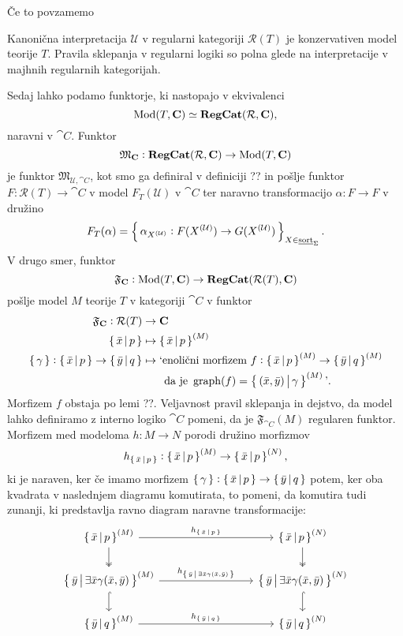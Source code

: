 \documentclass[../kategoricna_logika.tex]{subfiles}
\begin{document}
Če to povzamemo 
\begin{izrek}
  Kanonična interpretacija $\mathcal{U}$ v regularni kategoriji $\mathcal{R}(T)$ je konzervativen model teorije $T$. Pravila sklepanja v regularni logiki so polna glede na interpretacije v majhnih regularnih kategorijah.
\end{izrek}
Sedaj lahko podamo funktorje, ki nastopajo v ekvivalenci 
$$\operatorname{Mod}(T, {\operatorname{\mathbf{C}}}) \simeq {\operatorname{\mathbf{RegCat}}}(\mathcal{R}, {\operatorname{\mathbf{C}}}),$$
naravni v $\cat{C}$. Funktor 
$$\mathfrak{M}_{{\operatorname{\mathbf{C}}}} : {\operatorname{\mathbf{RegCat}}}(\mathcal{R}, {\operatorname{\mathbf{C}}}) \to \operatorname{Mod}(T, {\operatorname{\mathbf{C}}})$$
je funktor $\mathfrak{M}_{\mathcal{U}, \cat{C}}$, kot smo ga definiral v definiciji ?? in pošlje funktor $F : \mathcal{R}(T) \to \cat{C}$ v model $F_T(\mathcal{U})$ v $\cat{C}$ ter naravno transformacijo $\alpha : F \to F$ v družino
$$F_T(\alpha) = \left\lbrace\,\alpha_{{X}^{(\mathcal{U})}} : F({X}^{(\mathcal{U})}) \to G({X}^{(\mathcal{U})})\,\right\rbrace_{X \in \underline{\mathrm{sort}}_{\Sigma}}.$$
V drugo smer, funktor 
$$\mathfrak{F}_{{\operatorname{\mathbf{C}}}} : \operatorname{Mod}(T, {\operatorname{\mathbf{C}}}) \to {\operatorname{\mathbf{RegCat}}}(\mathcal{R}(T), {\operatorname{\mathbf{C}}})$$
pošlje model $M$ teorije $T$ v kategoriji $\cat{C}$ v funktor
\begin{align*}
  \mathfrak{F}_{{\operatorname{\mathbf{C}}}} : \mathcal{R}(T) &\to {\operatorname{\mathbf{C}}}\\
  \left\lbrace\,\bar{x}\,\middle|\, p\,\right\rbrace &\mapsto \left\lbrace\,\bar{x}\,\middle|\, p\,\right\rbrace^{(M)} \\
  \left\lbrace\,\gamma\,\right\rbrace : \left\lbrace\,\bar{x}\,\middle|\, p\,\right\rbrace \to \left\lbrace\,\bar{y}\,\middle|\, q\,\right\rbrace &\mapsto \text{`enolični morfizem} \ f : \left\lbrace\,\bar{x}\,\middle|\, p\,\right\rbrace^{(M)} \to \left\lbrace\,\bar{y}\,\middle|\, q\,\right\rbrace^{(M)} \\ 
  &\qquad \text{da je} \ \operatorname{graph}(f) = \left\lbrace\,(\bar{x}, \bar{y}) \,\middle|\, \gamma\,\right\rbrace^{(M)} \text{'}.
\end{align*}
Morfizem $f$ obstaja po lemi ??. Veljavnost pravil sklepanja in dejstvo, da model lahko definiramo z interno logiko $\cat{C}$ pomeni, da je $\mathfrak{F}_{\cat{C}}(M)$ regularen funktor.
Morfizem med modeloma $h : M \to N$ porodi družino morfizmov 
$$h_{\left\lbrace\,\bar{x}\,\middle|\, p\,\right\rbrace} : \left\lbrace\,\bar{x}\,\middle|\, p\,\right\rbrace^{(M)} \to \left\lbrace\,\bar{x}\,\middle|\, p\,\right\rbrace^{(N)},$$
ki je naraven, ker če imamo morfizem $\left\lbrace\,\gamma\,\right\rbrace : \left\lbrace\,\bar{x}\,\middle|\, p\,\right\rbrace \to \left\lbrace\,\bar{y}\,\middle|\, q\,\right\rbrace$ potem, ker oba kvadrata v naslednjem diagramu komutirata, to pomeni, da komutira tudi zunanji, ki predstavlja ravno diagram naravne transformacije:
\begin{equation*}
  \begin{tikzcd}[column sep=3cm]
    \set{\bar{x}\,\middle|\, p}^{(M)} \ar[d, two heads] \ar[r, "h_{\set{\bar{x}\,\middle|\, p}}"] & \set{\bar{x}\,\middle|\, p}^{(N)} \ar[d, two heads] \\
    \set{\bar{y}\,\middle|\, \exists \bar{x} \gamma(\bar{x}, \bar{y})}^{(M)}  \ar[d, hook] \ar[r, "h_{\set{\bar{y}\,\middle|\, \exists \bar{x} \gamma(\bar{x}, \bar{y})}}"] & \set{\bar{y}\,\middle|\, \exists \bar{x} \gamma(\bar{x}, \bar{y})}^{(N)} \ar[d, hook] \\
    \set{\bar{y}\,\middle|\, q}^{(M)} \ar[r, "h_{\set{\bar{y}\,\middle|\, q}}"] & \set{\bar{y}\,\middle|\, q}^{(N)}
  \end{tikzcd}
\end{equation*}
\end{document}
